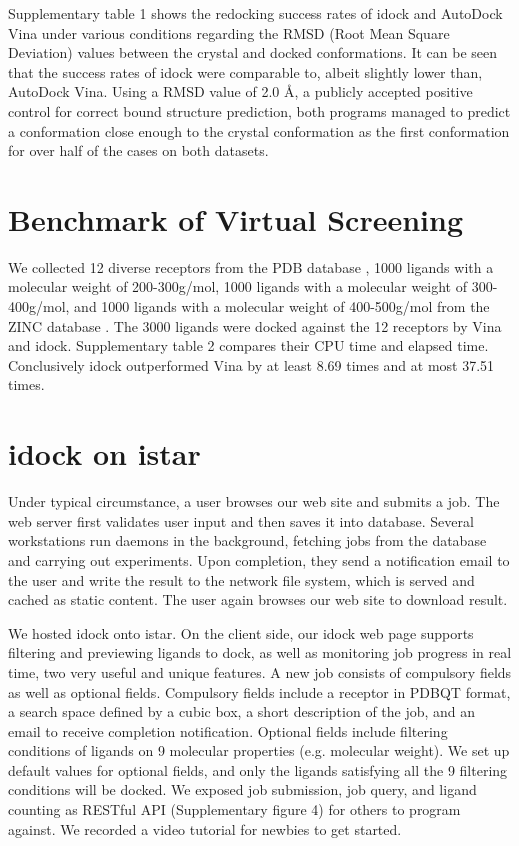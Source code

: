 \documentclass{bioinfo}
\begin{document}
Supplementary table 1 shows the redocking success rates of idock and AutoDock Vina under various conditions regarding the RMSD (Root Mean Square Deviation) values between the crystal and docked conformations. It can be seen that the success rates of idock were comparable to, albeit slightly lower than, AutoDock Vina. Using a RMSD value of 2.0 \AA, a publicly accepted positive control for correct bound structure prediction, both programs managed to predict a conformation close enough to the crystal conformation as the first conformation for over half of the cases on both datasets.

\section{Benchmark of Virtual Screening}

We collected 12 diverse receptors from the PDB database \citep{540}, 1000 ligands with a molecular weight of 200-300g/mol, 1000 ligands with a molecular weight of 300-400g/mol, and 1000 ligands with a molecular weight of 400-500g/mol from the ZINC database \citep{1178}. The 3000 ligands were docked against the 12 receptors by Vina and idock. Supplementary table 2 compares their CPU time and elapsed time. Conclusively idock outperformed Vina by at least 8.69 times and at most 37.51 times.

\section{idock on istar}

Under typical circumstance, a user browses our web site and submits a job. The web server first validates user input and then saves it into database. Several workstations run daemons in the background, fetching jobs from the database and carrying out experiments. Upon completion, they send a notification email to the user and write the result to the network file system, which is served and cached as static content. The user again browses our web site to download result.

We hosted idock onto istar. On the client side, our idock web page supports filtering and previewing ligands to dock, as well as monitoring job progress in real time, two very useful and unique features. A new job consists of compulsory fields as well as optional fields. Compulsory fields include a receptor in PDBQT format, a search space defined by a cubic box, a short description of the job, and an email to receive completion notification. Optional fields include filtering conditions of ligands on 9 molecular properties (e.g. molecular weight). We set up default values for optional fields, and only the ligands satisfying all the 9 filtering conditions will be docked. We exposed job submission, job query, and ligand counting as RESTful API (Supplementary figure 4) for others to program against. We recorded a video tutorial for newbies to get started.
\end{document}
